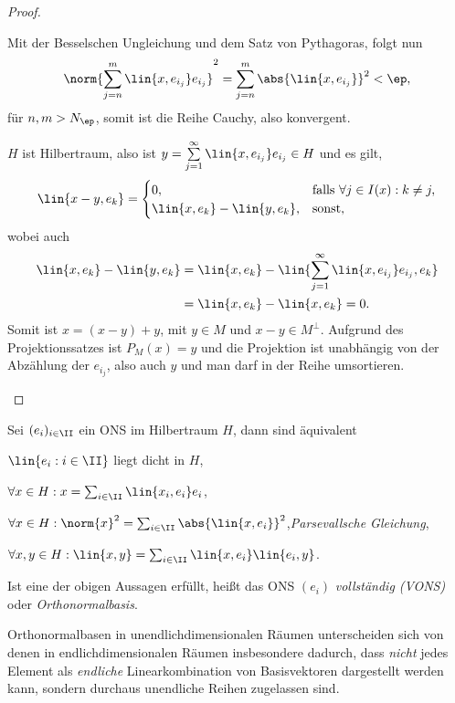 \begin{proof}
\begin{proofenum}
Mit der Besselschen Ungleichung und dem Satz von Pythagoras, folgt nun
\begin{align*}
\norm{\sum\limits_{j=n}^m \lin{x,e_{i_j}}e_{i_j}}^2 = 
\sum\limits_{j=n}^m \abs{\lin{x,e_{i_j}}}^2 < \ep,
\end{align*}
für $n,m>N_\ep$, somit ist die Reihe Cauchy, also konvergent.

$H$ ist Hilbertraum, also ist $y=\sum\limits_{j=1}^\infty
\lin{x,e_{i_j}}e_{i_j}\in H$ und es gilt,
\begin{align*}
\lin{x-y,e_k}
=
\begin{cases}
0, & \text{falls } \forall j\in I(x) : k\neq j,\\
\lin{x,e_k}-\lin{y,e_k}, & \text{sonst},
\end{cases}
\end{align*}
wobei auch
\begin{align*}
\lin{x,e_k}-\lin{y,e_k}&=
\lin{x,e_k}-\lin{\sum\limits_{j=1}^\infty\lin{x,e_{i_j}}e_{i_j},e_k}\\
&= \lin{x,e_k}-\lin{x,e_k} = 0.
\end{align*}
Somit ist $x=(x-y)+y$, mit $y\in M$ und $x-y\in M^\bot$.
Aufgrund des Projektionssatzes ist $P_M(x) = y$ und die Projektion ist
unabhängig von der Abzählung der $e_{i_j}$, also auch $y$ und man darf in der
Reihe umsortieren.\qedhere
\end{proofenum}
\end{proof}

\begin{prop}
\label{prop:5.22}
Sei $(e_i)_{i\in\II}$ ein ONS im Hilbertraum $H$, dann sind äquivalent
\begin{propenum}
  \item\label{prop:5.22:1} $\lin{e_i : i\in \II}$ liegt dicht in $H$,
  \item\label{prop:5.22:2} $\forall x\in H : x=\sum_{i\in\II}
  \lin{x_i,e_i}e_i$,
  \item\label{prop:5.22:3} $\forall x\in H : \norm{x}^2 = \sum_{i\in\II}
  \abs{\lin{x,e_i}}^2$,\qquad \emph{Parsevallsche Gleichung},
  \item\label{prop:5.22:4} $\forall x,y\in H : \lin{x,y} = \sum_{i\in\II}
  \lin{x,e_i}\lin{e_i,y}$.
\end{propenum}
Ist eine der obigen Aussagen erfüllt, heißt das ONS $(e_i)$
\emph{vollständig (VONS)} oder
\emph{Orthonormalbasis}.\fishhere
\end{prop}

Orthonormalbasen in unendlichdimensionalen Räumen unterscheiden sich von denen
in endlichdimensionalen Räumen insbesondere dadurch, dass \textit{nicht} jedes
Element als \textit{endliche} Linearkombination von Basisvektoren dargestellt werden
kann, sondern durchaus unendliche Reihen zugelassen sind.

